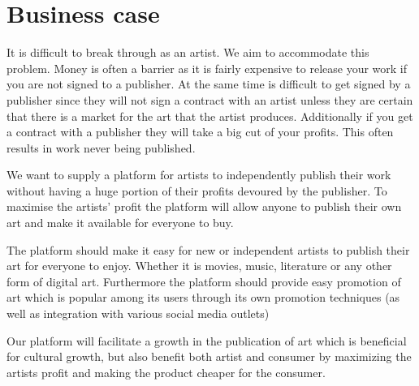 \documentclass[]{article}
\title{}
\author{}
\begin{document}
\section{Business case}

It is difficult to break through as an artist. We aim to accommodate this problem. Money is often a barrier as it is fairly expensive to release your work if you are not signed to a publisher. At the same time is difficult to get signed by a publisher since they will not sign a contract with an artist unless they are certain that there is a market for the art that the artist produces. Additionally if you get a contract with a publisher they will take a big cut of your profits. This often results in work never being published. 

We want to supply a platform for artists to independently publish their work without having a huge portion of their profits devoured by the publisher. To maximise the artists' profit the platform will allow anyone to publish their own art and make it available for everyone to buy.

The platform should make it easy for new or independent artists to publish their art for everyone to enjoy. Whether it is movies, music, literature or any other form of digital art. Furthermore the platform should provide easy promotion of art which is popular among its users through its own promotion techniques (as well as integration with various social media outlets)

Our platform will facilitate a growth in the publication of art which is beneficial for cultural growth, but also benefit both artist and consumer by maximizing the artists profit and making the product cheaper for the consumer. 
\end{document}
